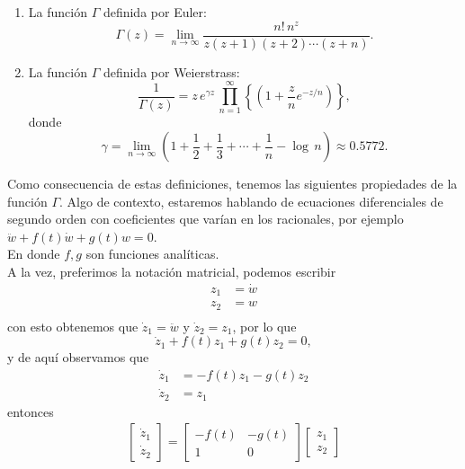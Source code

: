 \documentclass[main.tex]{subfiles}
\begin{document}
\begin{enumerate}
  \item La función $\Gamma$ definida por Euler:
        \[
          \Gamma(z)=\lim_{n\to\infty}\frac{n!\,n^{z}}{z(z+1)(z+2)\cdots(z+n)}.
        \]
  \item La función $\Gamma$ definida por Weierstrass:
        \[
          \frac{1}{\Gamma(z)}=z\,e^{\gamma z}\,\prod_{n=1}^{\infty}\left\{\left(1+\frac{z}{n}e^{-z/n}\right)\right\},
        \]
        donde
        \begin{equation}
          \label{eq1.1}
          \gamma=\lim_{n\to\infty}\left(1+\frac{1}{2}+\frac{1}{3}+\cdots+\frac{1}{n}-\log\,n\right)\approx 0.5772.
        \end{equation}
\end{enumerate}
Como consecuencia de estas definiciones, tenemos las siguientes propiedades de la función $\Gamma$.
Algo de contexto, estaremos hablando de ecuaciones diferenciales de segundo orden con coeficientes que varían en los racionales, por ejemplo $\ddot{w}+f(t)\dot{w}+g(t)w=0$.\\
En donde $f,g$ son funciones analíticas.\\
A la vez, preferimos la notación matricial, podemos escribir
\begin{align*}
  z_{1}&=\dot{w}\\
  z_{2}&=w\\
\end{align*}
con esto obtenemos que $\dot{z}_{1}=\ddot{w}$ y $\dot{z}_{2}=z_{1}$, por lo que
\[
  \dot{z}_{1}+f(t)z_{1}+g(t)z_{2}=0,
\]
y de aquí observamos que
\begin{align*}
  \dot{z}_{1}&=-f(t)z_{1}-g(t)z_{2}\\
  \dot{z}_{2}&=z_{1}
\end{align*}
entonces
\begin{gather*}
  \begin{bmatrix}%
			\dot{z}_{1}\\
			\dot{z}_{2}
		\end{bmatrix}
		=
		\begin{bmatrix}
			-f(t) & -g(t)\\
			1 & 0
		\end{bmatrix}
		\begin{bmatrix}
			z_1\\
			z_2
		\end{bmatrix}
	\end{gather*}
\end{document}
